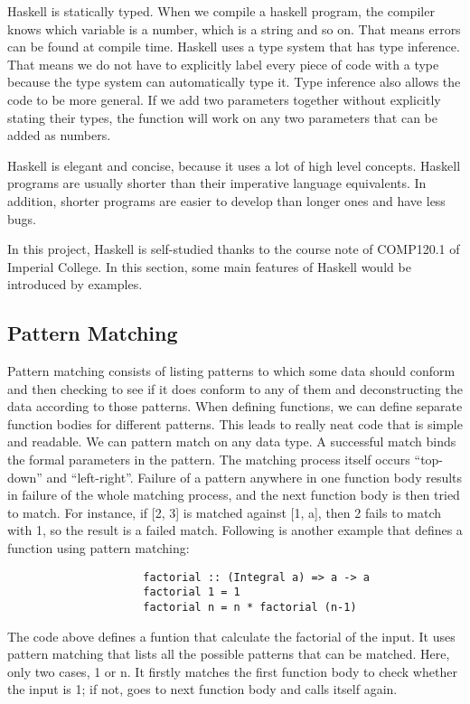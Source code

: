 Haskell is statically typed. When we compile a haskell program, the compiler knows which variable is a number, which is a string and so on. That means errors can be found at compile time. Haskell uses a type system that has type inference. That means we do not have to explicitly label every piece of code with a type because the type system can automatically type it. Type inference also allows the code to be more general. If we add two parameters together without explicitly stating their types, the function will work on any two parameters that can be added as numbers. 

Haskell is elegant and concise, because it uses a lot of high level concepts. Haskell programs are usually shorter than their imperative language equivalents. In addition, shorter programs are easier to develop than longer ones and have less bugs. 

In this project, Haskell is self-studied thanks to the course note of COMP120.1 of Imperial College. In this section, some main features of Haskell would be introduced by examples.

\subsection{Pattern Matching}
Pattern matching consists of listing patterns to which some data should conform and then checking to see if it does conform to any of them and deconstructing the data according to those patterns. When defining functions, we can define separate function bodies for different patterns. This leads to really neat code that is simple and readable. We can pattern match on any data type. A successful match binds the formal parameters in the pattern. The matching process itself occurs ``top-down'' and ``left-right''. Failure of a pattern anywhere in one function body results in failure of the whole matching process, and the next function body is then tried to match. For instance, if [2, 3] is matched against [1, a], then 2 fails to match with 1, so the result is a failed match. Following is another example that defines a function using pattern matching:

\begin{verbatim}
                     factorial :: (Integral a) => a -> a  
                     factorial 1 = 1
                     factorial n = n * factorial (n-1)
\end{verbatim}

The code above defines a funtion that calculate the factorial of the input. It uses pattern matching that lists all the possible patterns that can be matched. Here, only two cases, 1 or n. It firstly matches the first function body to check whether the input is 1; if not, goes to next function body and calls itself again.   

